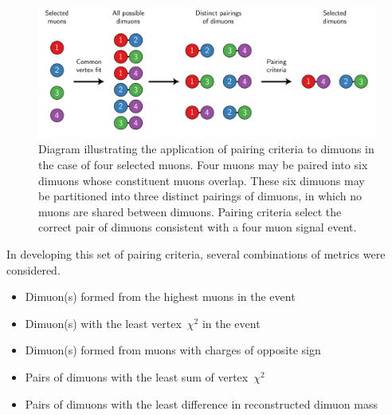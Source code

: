 \begin{figure}[htpb]
  \centering
  \includegraphics[width=\textwidth]{figures/displaced/PairingCriteriaDiagram.pdf}
  \caption{Diagram illustrating the application of pairing criteria to dimuons in the case of four selected muons. Four muons may be paired into six dimuons whose constituent muons overlap. These six dimuons may be partitioned into three distinct pairings of dimuons, in which no muons are shared between dimuons. Pairing criteria select the correct pair of dimuons consistent with a four muon signal event.}
  \label{fig:dd:pc}
\end{figure}

In developing this set of pairing criteria, several combinations of metrics were considered.
\begin{itemize}
  \item Dimuon(s) formed from the highest \pT muons in the event
  \item Dimuon(s) with the least vertex~$\chi^2$ in the event
  \item Dimuon(s) formed from muons with charges of opposite sign
  \item Pairs of dimuons with the least sum of vertex~$\chi^2$
  \item Pairs of dimuons with the least difference in reconstructed dimuon mass
\end{itemize}

